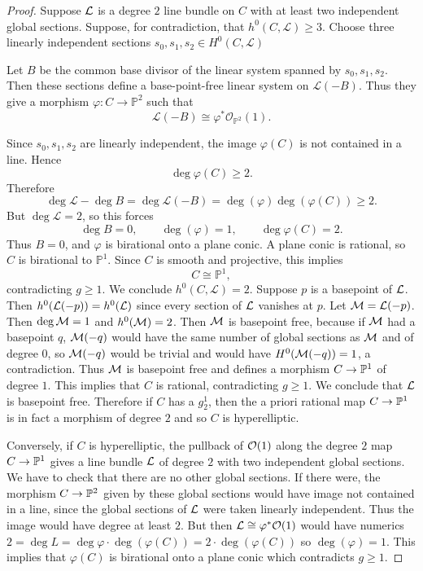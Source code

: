 \documentclass[12pt]{article}
\begin{document}
\begin{proof}
Suppose $\cL$ is a degree $2$ line bundle on $C$ with at least two independent global sections.
Suppose, for contradiction, that $h^0(C,\mathcal L)\geq 3$. Choose three linearly independent sections $s_0,s_1,s_2\in H^0(C,\mathcal L)$

Let $B$ be the common base divisor of the linear system spanned by $s_0,s_1,s_2$. Then these sections define a base-point-free linear system on $\mathcal L(-B)$.
Thus they give a morphism $\varphi:C\to \mathbb P^2$
such that
\[
\mathcal L(-B)\cong \varphi^*\mathcal O_{\mathbb P^2}(1).
\]

Since $s_0,s_1,s_2$ are linearly independent, the image $\varphi(C)$ is not contained in a line. Hence
\[
\deg \varphi(C)\geq 2.
\]
Therefore
\[
\deg \mathcal L-\deg B
=
\deg \mathcal L(-B)
=
\deg(\varphi)\deg(\varphi(C))
\geq 2.
\]
But $\deg \mathcal L=2$, so this forces
\[
\deg B=0,\qquad \deg(\varphi)=1,\qquad \deg \varphi(C)=2.
\]
Thus $B=0$, and $\varphi$ is birational onto a plane conic. A plane conic is rational, so $C$ is birational to $\mathbb P^1$. Since $C$ is smooth and projective, this implies
\[
C\cong \mathbb P^1,
\]
contradicting $g\geq 1$. We conclude $h^0(C,\mathcal L)=2$.
Suppose $p$ is a basepoint of $\cL$. Then $h^0(\cL(-p)) = h^0(\cL)$ since every section of $\cL$ vanishes at $p$. Let $\cM = \cL(-p)$. Then $\deg \cM = 1$ and $h^0(\cM) = 2$. Then $\cM$ is basepoint free, because if $\cM$ had a basepoint $q$, $\cM(-q)$ would have the same number of global sections as $\cM$ and of degree $0$, so $\cM(-q)$ would be trivial and would have $H^0(\cM(-q)) = 1$, a contradiction. Thus $\cM$ is basepoint free and defines a morphism $C \to \P^1$ of degree $1$. This implies that $C$ is rational, contradicting $g \geq 1$. We conclude that $\cL$ is basepoint free. Therefore if $C$ has a $g^1_2$, then the a priori rational map $C \to \P^1$ is in fact a morphism of degree $2$ and so $C$ is hyperelliptic. 



Conversely, if $C$ is hyperelliptic, the pullback of $\cO(1)$ along the degree $2$ map $C \to \P^1$ gives a line bundle $\cL$ of degree $2$ with two independent global sections. We have to check that there are no other global sections. If there were, the morphism $C \to \P^2$ given by these global sections would have image not contained in a line, since the global sections of $\cL$ were taken linearly independent. Thus the image would have degree at least $2$. But then $\cL \cong \varphi^* \cO(1)$ would have numerics $2 = \deg L = \deg \varphi \cdot \deg(\varphi(C)) = 2 \cdot \deg(\varphi(C))$ so $\deg(\varphi) = 1$. This implies that $\varphi(C)$ is birational onto a plane conic which contradicts $g \geq 1$.
\end{proof}
\end{document}
